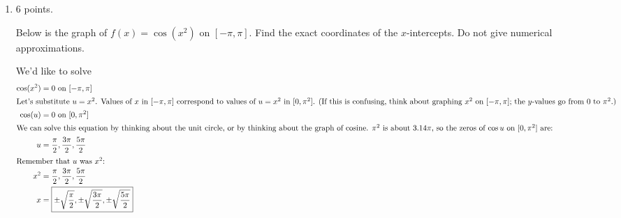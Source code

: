 \documentclass{article}
\begin{document}
\begin{enumerate}
\begin{enumerate}
\begin{solution}
\begin{center}
\begin{tabular}{cc}
        \end{tabular}
      \end{center}
      So, we've solved for $u$, which was $3x$:
      \begin{align*}
        3x &= u = \pi + \arcsin \tfrac{3}{4}, 2 \pi - \arcsin \tfrac{3}{4} \\
        \shortintertext{Therefore,} %
        x &= \boxed{\frac{\pi + \arcsin \frac{3}{4}}{3}, \frac{2 \pi -
            \arcsin \frac{3}{4}}{3}}\\
        \intertext{And here are the decimal approximations:}
        & \boxed{ \approx 1.33, 1.81}
      \end{align*}      
    \end{solution}

  \end{enumerate}

\item 

\begin{grading}
6 points.
\end{grading}


  \begin{problem}[\vfill]
    Below is the graph of $f(x) = \cos(x^2)$ on $[-\pi,\pi]$.  Find the
    exact coordinates of the $x$-intercepts. Do not give numerical approximations.

  \end{problem}

  \begin{solution}
    We'd like to solve
    \begin{align*}
      \cos(x^2) &= 0 \text{ on $[-\pi, \pi]$} \\
      \intertext{Let's substitute $u = x^2$.  Values of $x$ in $[-\pi,
        \pi]$ correspond to values of $u = x^2$ in $[0, \pi^2]$.  (If this
        is confusing, think about graphing $x^2$ on $[-\pi, \pi]$; the
        $y$-values go from $0$ to $\pi^2$.)}
      \cos(u) &= 0 \text{ on $[0, \pi^2]$} \\
      \intertext{We can solve this equation by thinking about the unit
        circle, or by thinking about the graph of cosine.  $\pi^2$ is
        about $3.14 \pi$, so the zeros of $\cos u$ on $[0, \pi^2]$ are:}
      u &= \frac{\pi}{2}, \frac{3 \pi}{2}, \frac{5 \pi}{2} \\
      \shortintertext{Remember that $u$ was $x^2$:}
      x^2 &= \frac{\pi}{2}, \frac{3 \pi}{2}, \frac{5 \pi}{2} \\
      x &= \boxed{\pm \sqrt{\frac{\pi}{2}}, \pm \sqrt{\frac{3 \pi}{2}},
        \pm \sqrt{\frac{5 \pi}{2}}}
    \end{align*}
  \end{solution}


\end{enumerate}
\end{document}
